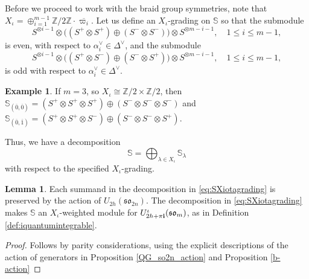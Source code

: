 \documentclass[10pt]{amsart}
\numberwithin{equation}{section}
\theoremstyle{definition}
\newtheorem{lemma}[theorem]{Lemma}
\newtheorem{example}[theorem]{Example}
\newcommand{\son}[1][2n]{\mathfrak{so}_{#1}}
\newcommand{\som}[1][m]{\mathfrak{so}_{#1}}
\newcommand{\ot}{\otimes}
\newcommand{\howespin}{\boldsymbol{\mathbb{S}}}
\begin{document}
Before we proceed to work with the braid group symmetries, note that $X_\iota =\oplus_{i=1}^{m-1} \mathbb{Z}/2\mathbb{Z}\cdot \overline{\varpi_i}$. Let us define an $X_\iota$-grading on $\howespin$ so that the submodule
\begin{equation}\label{eq:igradingeven}
    S^{\ot i-1}\ot \big((S^+\ot S^+) \oplus (S^- \ot S^-)\big)\ot S^{\ot m-i-1}, \quad 1\le i \le m-1,
\end{equation}
is even, with respect to $\alpha_i^{\vee}\in \Delta^{\vee}$, and the submodule
\begin{equation}\label{eq:igradingodd}
    S^{\ot i-1}\ot \Big((S^+\ot S^-) \oplus (S^- \ot S^+)\Big)\ot S^{\ot m-i-1}, \quad 1\le i \le m-1,
\end{equation}
is odd with respect to $\alpha_i^{\vee}\in \Delta^{\vee}$. 

\begin{example}
    If $m=3$, so $X_{\iota}\cong \mathbb{Z}/2\times \mathbb{Z}/2$, then $\howespin_{(\overline{0},\overline{0})} = (S^+\otimes S^+\otimes S^+) \oplus (S^-\otimes S^-\otimes S^-)$ and $\howespin_{(\overline{0},\overline{1})} = (S^+\otimes S^+\otimes S^-)\oplus (S^-\otimes S^-\otimes S^+)$.
\end{example}

Thus, we have a decomposition
\begin{equation}\label{eq:SXiotagrading}
    \howespin = \bigoplus_{\lambda\in X_{\iota}}\howespin_{\lambda}
\end{equation}
with respect to the specified $X_{\iota}$-grading.

\begin{lemma}
    Each summand in the decomposition in \eqref{eq:SXiotagrading} is preserved by the action of $U_{2h}(\son)$. The decomposition in \eqref{eq:SXiotagrading} makes $\howespin$ an $X_{\iota}$-weighted module for $U_{2h+\pi {\bf i}}^\iota (\som)$, as in Definition \ref{def:iquantumintegrable}.
\end{lemma} 
\begin{proof}
    Follows by parity considerations, using the explicit descriptions of the action of generators in Proposition \ref{QG_so2n_action} and Proposition \ref{b-action}
\end{proof}
\end{document}
